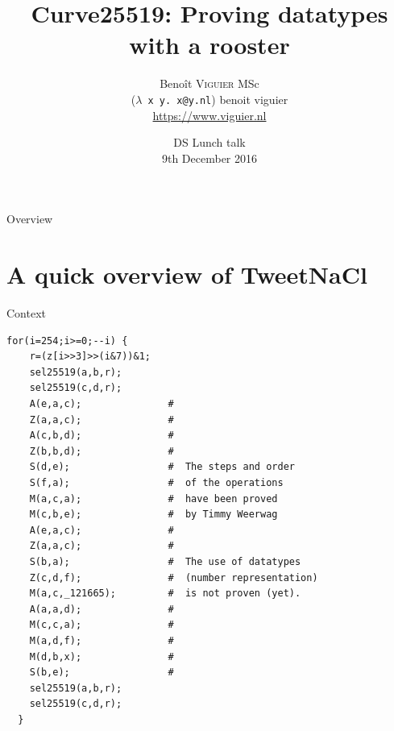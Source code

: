 \documentclass[8pt]{beamer}
\title{Curve25519: Proving datatypes with a rooster}
\author[Beno\^{i}t \textsc{Viguier} MSc]{
  \normalsize Beno\^{i}t \textsc{Viguier} MSc \\
  {\small (\texttt{$\lambda$ x y. x@y.nl}) benoit viguier} \\
  {\small \url{https://www.viguier.nl}}\\ \medskip}
\institute[Radboud University Nijmegen]{
  Institute for Computing and Information Sciences -- Digital Security \\
  Radboud University Nijmegen}
\date[9, Dec. 2016]{
  DS Lunch talk \\
  9th December 2016}
\begin{document}
%
%

\begin{frame}
\titlepage
\end{frame}

%
%

\begin{frame}{Overview}
\tableofcontents
\end{frame}

\section{A quick overview of TweetNaCl}
%
%
\begin{frame}[fragile]{Context}
  \begin{center}

\begin{lstlisting}[language=cnacl, caption=crypto\_scalarmult, label=cod:languageC11]
  for(i=254;i>=0;--i) {
    r=(z[i>>3]>>(i&7))&1;
    sel25519(a,b,r);
    sel25519(c,d,r);
    A(e,a,c);               #
    Z(a,a,c);               #
    A(c,b,d);               #
    Z(b,b,d);               #
    S(d,e);                 #  The steps and order
    S(f,a);                 #  of the operations
    M(a,c,a);               #  have been proved
    M(c,b,e);               #  by Timmy Weerwag
    A(e,a,c);               #
    Z(a,a,c);               #
    S(b,a);                 #  The use of datatypes
    Z(c,d,f);               #  (number representation)
    M(a,c,_121665);         #  is not proven (yet).
    A(a,a,d);               #
    M(c,c,a);               #
    M(a,d,f);               #
    M(d,b,x);               #
    S(b,e);                 #
    sel25519(a,b,r);
    sel25519(c,d,r);
  }
\end{lstlisting}

  \end{center}
\end{frame}
\end{document}
